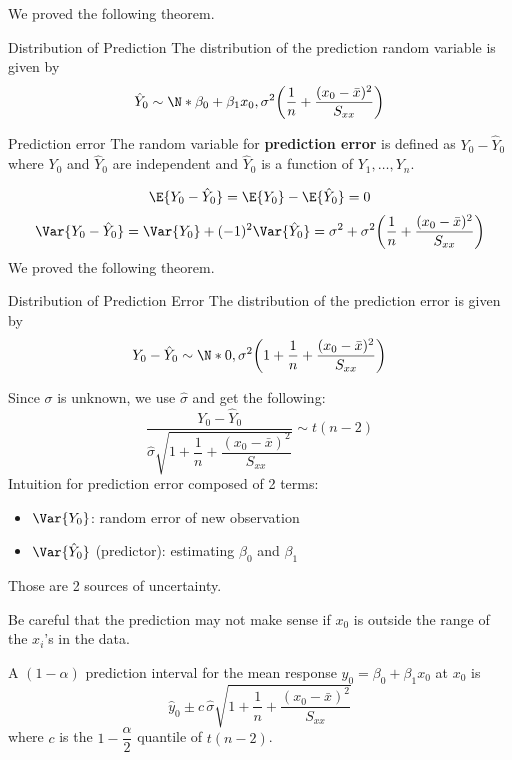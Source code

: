 We proved the following theorem.
\begin{Theorem}{Distribution of Prediction}{}
    The distribution of the prediction random variable is given by
    \[ \hat{Y}_0 \sim \N*{\beta_0+\beta_1x_0,
            \sigma^2\biggl( \frac{1}{n} +\frac{(x_0-\bar{x})^2}{S_{xx}}  \biggr)} \]
\end{Theorem}
\begin{Definition}{Prediction error}{}
    The random variable for \textbf{prediction error} is defined as
    $ Y_0-\hat{Y}_0 $
    where $ Y_0 $ and $ \hat{Y}_0 $ are independent
    and $ \hat{Y}_0 $ is a function of $ Y_1,\ldots,Y_n $.
\end{Definition}
\[ \E{Y_0-\hat{Y}_0}=\E{Y_0}-\E{\hat{Y}_0}=0 \]
\[ \Var{Y_0-\hat{Y}_0}=\Var{Y_0}+(-1)^2\Var{\hat{Y}_0}
    =\sigma^2+\sigma^2\biggl(\frac{1}{n} +\frac{(x_0-\bar{x})^2}{S_{xx}} \biggr)
\]
We proved the following theorem.
\begin{Theorem}{Distribution of Prediction Error}{}
    The distribution of the prediction error is given by
    \[ Y_0-\hat{Y}_0
        \sim \N*{0,\sigma^2\biggl( 1+\frac{1}{n}+\frac{(x_0-\bar{x})^2}{S_{xx}}  \biggr)} \]
\end{Theorem}
Since $ \sigma $ is unknown, we use $ \hat{\sigma} $ and get the following:
\[ \frac{Y_0-\hat{Y}_0}{
        \hat{\sigma}\sqrt{1+\dfrac{1}{n}+\dfrac{(x_0-\bar{x})^2}{S_{xx}}}
    } \sim t(n-2) \]
Intuition for prediction error composed of 2 terms:
\begin{itemize}
    \item $ \Var{Y_0} $: random error of new observation
    \item $ \Var{\hat{Y}_0} $ (predictor): estimating $ \beta_0 $ and $ \beta_1 $
\end{itemize}
Those are 2 sources of uncertainty.

\begin{Remark}{}{}
    Be careful that the prediction may not make sense if
    $ x_0 $ is outside the range of the $ x_i $'s in the data.
\end{Remark}

A $ (1-\alpha) $ prediction interval for the mean response $ y_0=\beta_0+\beta_1x_0 $
at $ x_0 $
is
\[ \hat{y}_0\pm c\, \hat{\sigma}\sqrt{1+\dfrac{1}{n}+\dfrac{(x_0-\bar{x})^2}{S_{xx}}}
\]
where $ c $ is the $ 1-\dfrac{\alpha}{2} $ quantile of $ t(n-2) $.
